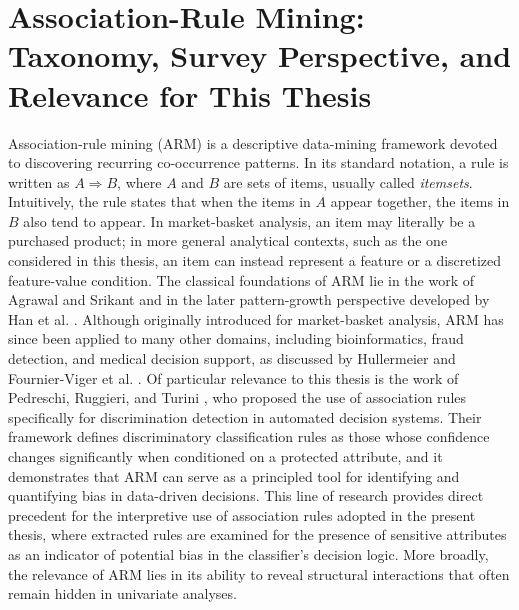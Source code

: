 \section{Association-Rule Mining: Taxonomy, Survey Perspective, and Relevance for This Thesis}
Association-rule mining (ARM) is a descriptive data-mining framework devoted to discovering recurring co-occurrence patterns. In its standard notation, a rule is written as $A \Rightarrow B$, where $A$ and $B$ are sets of items, usually called \emph{itemsets}. Intuitively, the rule states that when the items in $A$ appear together, the items in $B$ also tend to appear. In market-basket analysis, an item may literally be a purchased product; in more general analytical contexts, such as the one considered in this thesis, an item can instead represent a feature or a discretized feature-value condition. The classical foundations of ARM lie in the work of Agrawal and Srikant \cite{agrawal1994fast} and in the later pattern-growth perspective developed by Han et al. \cite{han2000mining}. Although originally introduced for market-basket analysis, ARM has since been applied to many other domains, including bioinformatics, fraud detection, and medical decision support, as discussed by Hullermeier \cite{hullermeier2006association} and Fournier-Viger et al. \cite{fournierviger2017survey}. Of particular relevance to this thesis is the work of Pedreschi, Ruggieri, and Turini \cite{pedreschi2008discriminationaware}, who proposed the use of association rules specifically for discrimination detection in automated decision systems. Their framework defines discriminatory classification rules as those whose confidence changes significantly when conditioned on a protected attribute, and it demonstrates that ARM can serve as a principled tool for identifying and quantifying bias in data-driven decisions. This line of research provides direct precedent for the interpretive use of association rules adopted in the present thesis, where extracted rules are examined for the presence of sensitive attributes as an indicator of potential bias in the classifier's decision logic. More broadly, the relevance of ARM lies in its ability to reveal structural interactions that often remain hidden in univariate analyses.

